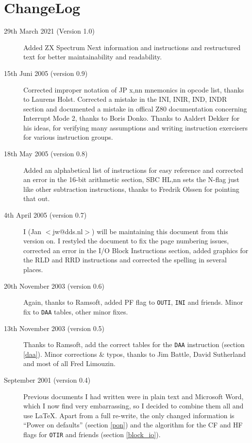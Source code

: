\documentclass[twoside,openright,a4paper]{book}
\begin{document}
\section{ChangeLog}
\begin{description}

\item[29th March 2021 (Version 1.0)]
Added ZX Spectrum Next information and instructions and restructured text for better maintainability and readability.

\item[15th Juni 2005 (version 0.9)]
Corrected improper notation of JP x,nn mnemonics in opcode list, thanks to
Laurens Holst. Corrected a mistake in the INI, INIR, IND, INDR section 
and documented a mistake in offical Z80 documentation concerning Interrupt 
Mode 2, thanks to Boris Donko. Thanks to Aaldert Dekker for his ideas, for 
verifying many assumptions and writing instruction exercisers for various 
instruction groups.

\item[18th May 2005 (version 0.8)]
Added an alphabetical list of instructions for easy reference and corrected an 
error in the 16-bit arithmetic section, SBC HL,nn sets the N-flag just like
other subtraction instructions, thanks to Fredrik Olssen for pointing that out.

\item[4th April 2005 (version 0.7)]
I (Jan $<$jw@dds.nl$>$) will be maintaining this document from this version on.
I restyled the document to fix the page numbering issues, 
corrected an error in the I/O Block Instructions section, added 
graphics for the RLD and RRD instructions and corrected the spelling in several places.

\item[20th November 2003 (version 0.6)]
Again, thanks to Ramsoft, added PF flag to {\tt OUTI}, {\tt INI} and
friends. Minor fix to {\tt DAA} tables, other minor fixes.

\item[13th November 2003 (version 0.5)]
Thanks to Ramsoft, add the correct tables for the {\tt DAA} instruction
(section \ref{daa}). Minor corrections \& typos, thanks to Jim Battle,
David Sutherland and most of all Fred Limouzin.

\item[September 2001 (version 0.4)]
Previous documents I had written were in plain text and Microsoft
Word, which I now find very embarrassing, so I decided to combine them all 
and use {\LaTeX}. Apart from a full re-write, the only changed information is
``Power on defaults'' (section \ref{pon}) and the algorithm for the CF 
and HF flags for {\tt OTIR} and friends (section \ref{block_io}).

\end{description}
\end{document}
